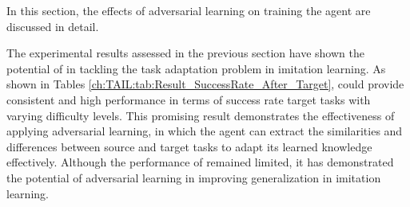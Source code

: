 In this section,
the effects of adversarial learning on training the \TAIL{} agent are discussed in detail.

The experimental results assessed in the previous section have shown the potential of \TAIL{} in tackling the task adaptation problem in imitation learning.
As shown in Tables \ref{ch:TAIL:tab:Result_SuccessRate_After_Target},
\TAIL{} could provide consistent and high performance in terms of success rate target tasks with varying difficulty levels.
This promising result demonstrates the effectiveness of applying adversarial learning,
in which the agent can extract the similarities and differences between source and target tasks to adapt its learned knowledge effectively.
Although the performance of \TAIL{} remained limited,
it has demonstrated the potential of adversarial learning in improving generalization in imitation learning.
